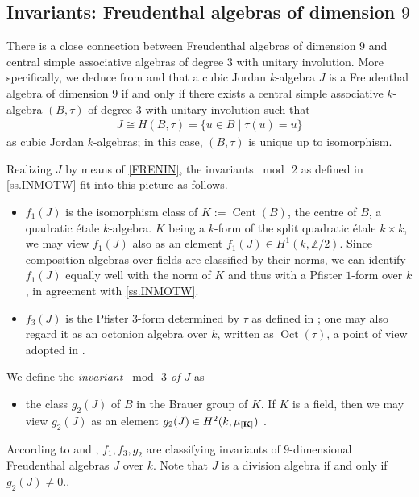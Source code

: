 \documentclass{amsart}
\theoremstyle{definition} %
\theoremstyle{remark} %
\DeclareMathOperator{\Cent}{Cent}
\newcommand{\ZZ}{\mathbb{Z}}
\newcommand{\IZ}{\ZZ}
\DeclareMathOperator{\Oct}{Oct}
\renewcommand{\:}{\colon\,}
\numberwithin{equation}{section}
\begin{document}
\subsection{Invariants: Freudenthal algebras of dimension $9$} \label{ss.INMOTH} There is a close connection between Freudenthal algebras of dimension $9$ and central simple associative algebras of degree $3$ with unitary involution. More specifically, we deduce from \cite[Exc.~55.12]{MR4806163} and \cite[Exc.~55.12]{garibaldi2025solutionsexercisesbookalbert} that a cubic Jordan $k$-algebra $J$ is a Freudenthal algebra of dimension $9$ if and only if there exists a central simple associative $k$-algebra $(B,\tau)$ 
of degree $3$ with unitary involution \cite[44.23, Exc.~9.33]{MR4806163} such that
\begin{align}
\label{FRENIN} J \cong H(B,\tau) = \{u \in B \mid \tau(u) = u\}
\end{align}
as cubic Jordan $k$-algebras; in this case, $(B,\tau)$ is unique up to isomorphism.

Realizing $J$ by means of \eqref{FRENIN}, the invariants $\bmod\,2$ as defined in \ref{ss.INMOTW} fit into this picture as follows.
\begin{itemize}
\item $f_1(J)$ is the isomorphism class of $K := \Cent(B)$, the centre of $B$, a quadratic \'etale $k$-algebra. $K$ being a $k$-form of the split quadratic \'etale $k \times k$, we may view $f_1(J)$ also as an element $f_1(J) \in H^1(k,\IZ/2)$. Since composition algebras over fields are classified by their norms, we can identify $f_1(J)$ equally well with the norm of $K$ and thus with a Pfister $1$-form over $k$, in agreement with \ref{ss.INMOTW}. 

\item $f_3(J)$ is the Pfister $3$-form determined by $\tau$ as defined in \cite[(19.4)]{MR1632779}; one may also regard it as an octonion algebra over $k$, written as $\Oct(\tau)$, a point of view adopted in \cite[Exc.~46.23~(a)]{MR4806163}. 
\end{itemize}
We define the \emph{invariant $\bmod\,3$ of $J$} as 
\begin{itemize}
\item the class $g_2(J)$ of $B$ in the Brauer group of $K$. If $K$ is a field, then we may view $g_2(J)$ as an element $g_2(J) \in H^2(k,\bf{\mu}_{[K]})$ \cite[(30.16)]{MR1632779}.
\end{itemize}
According to \cite[Thm.~(30.21)]{MR1632779} and \cite[Thm.~2.4]{MR2063796}, $f_1,f_3,g_2$ are classifying invariants of $9$-dimensional Freudenthal algebras $J$ over $k$. Note that $J$ is a division algebra if and only if $g_2(J) \ne 0$..
\end{document}
